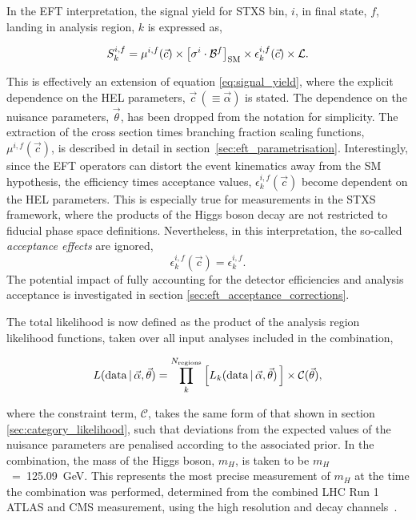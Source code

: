 In the EFT interpretation, the signal yield for STXS bin, $i$, in final state, $f$, landing in analysis region, $k$ is expressed as, 

\begin{equation}\label{eq:signal_yield_eft}
    S_k^{i,f} = \mu^{i,f}(\vec{c}) \times \big[\sigma^i \cdot \mathcal{B}^{f} \big]_{\rm{SM}} \times \epsilon^{i,f}_k(\vec{c}) \times \mathcal{L}.
\end{equation}

\noindent
This is effectively an extension of equation \ref{eq:signal_yield}, where the explicit dependence on the HEL parameters, $\vec{c}\,(\equiv\vec{\alpha})$ is stated. The dependence on the nuisance parameters, $\vec{\theta}$, has been dropped from the notation for simplicity. The extraction of the cross section times branching fraction scaling functions, $\mu^{i,f}(\vec{c})$, is described in detail in section~\ref{sec:eft_parametrisation}. Interestingly, since the EFT operators can distort the event kinematics away from the SM hypothesis, the efficiency times acceptance values, $\epsilon^{i,f}_k(\vec{c})$ become dependent on the HEL parameters. This is especially true for measurements in the STXS framework, where the products of the Higgs boson decay are not restricted to fiducial phase space definitions. Nevertheless, in this interpretation, the so-called \textit{acceptance effects} are ignored,
\begin{equation}
   \epsilon^{i,f}_k(\vec{c})=\epsilon^{i,f}_k. 
\end{equation}
The potential impact of fully accounting for the detector efficiencies and analysis acceptance is investigated in section \ref{sec:eft_acceptance_corrections}.

The total likelihood is now defined as the product of the analysis region likelihood functions, taken over all input analyses included in the combination,

\begin{equation}
    L({\rm{data}}\,|\,\vec{\alpha},\vec{\theta}) = \prod_{k}^{N_{\rm{regions}}} \Big[    L_k({\rm{data}}\,|\,\vec{\alpha},\vec{\theta}) \,\Big] \times \mathcal{C}(\vec{\theta}) ,
\end{equation}

\noindent
where the constraint term, $\mathcal{C}$, takes the same form of that shown in section \ref{sec:category_likelihood}, such that deviations from the expected values of the nuisance parameters are penalised according to the associated prior. In the combination, the mass of the Higgs boson, $m_H$, is taken to be $m_H$~=~125.09~GeV. This represents the most precise measurement of $m_H$ at the time the combination was performed, determined from the combined LHC Run 1 ATLAS and CMS measurement, using the high resolution \Hgg and \Hfl decay channels~\cite{Aad:2015zhl}.

